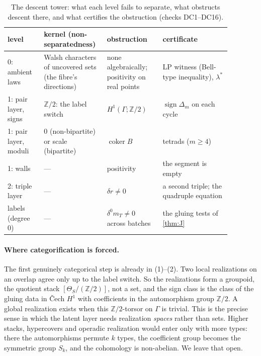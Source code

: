 \documentclass[11pt]{article}
\theoremstyle{definition}\newtheorem{definition}{Definition}\newtheorem{remark}{Remark}
\begin{document}
\begin{table}[!htbp]\centering\small
\begin{tabular}{p{0.15\linewidth}p{0.22\linewidth}p{0.23\linewidth}p{0.28\linewidth}}\toprule
level & kernel (non-separatedness) & obstruction & certificate\\\midrule
0: ambient laws & Walsh characters of uncovered sets (the fibre's directions) & none algebraically; positivity on real points & LP witness (Bell-type inequality), $\lambda^*$\\
1: pair layer, signs & $\mathbb Z/2$: the label switch & $H^1(\Gamma;\mathbb Z/2)$ & $\operatorname{sign}\Delta_m$ on each cycle\\
1: pair layer, moduli & $0$ (non-bipartite) or scale (bipartite) & $\operatorname{coker}B$ & tetrads ($m\ge4$)\\
1: walls & --- & positivity & the segment is empty\\
2: triple layer & --- & $\delta r\ne0$ & a second triple; the quadruple equation\\
labels (degree 0) & --- & $\delta^0m_T\ne0$ across batches & the gluing tests of \cref{thm:J}\\\bottomrule
\end{tabular}
\caption{The descent tower: what each level fails to separate, what obstructs descent there, and what certifies the obstruction
(checks DC1--DC16).}\label{tab:tower}
\end{table}

\paragraph{Where categorification is forced.} The first genuinely categorical step is already in (1)--(2). Two local realizations on an
overlap agree only up to the label switch. So the realizations form a groupoid, the quotient stack $[\Theta_S/(\mathbb Z/2)]$, not a set,
and the sign class is the class of the gluing data in Čech $H^1$ with coefficients in the automorphism group $\mathbb Z/2$. A global
realization exists when this $\mathbb Z/2$-torsor on $\Gamma$ is trivial. This is the precise sense in which the latent layer needs
realization \emph{spaces} rather than sets. Higher stacks, hypercovers and operadic realization would enter only with more types: there
the automorphisms permute $k$ types, the coefficient group becomes the symmetric group $S_k$, and the cohomology is non-abelian. We leave
that open.
\end{document}
